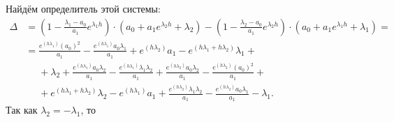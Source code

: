 \documentclass[a4paper,14pt]{article}
\begin{document}
Найдём определитель этой системы:
\[
  \begin{aligned}
    \Delta
    &=
      \left( 1 - \frac{\lambda_1 - a_0}{a_1} e^{\lambda_1 h} \right)
      \cdot
      \left(
      a_0 + a_1 e^{\lambda_2 h} + \lambda_2
      \right)
      -
      \left( 1 - \frac{\lambda_2 - a_0}{a_1} e^{\lambda_2 h} \right)
      \cdot
      \left(
      a_0 + a_1 e^{\lambda_1 h} + \lambda_1
      \right) = \\
    &=
    \frac{e^{(h \lambda_1)} (a_0)^2}{a_1}
    - \frac{e^{(h \lambda_1)} a_0 \lambda_1}{a_1}
    + e^{(h \lambda_2)} a_1 - e^{(h \lambda_1 + h \lambda_2)} \lambda_1 + \\
    &\phantom{=}
    + \lambda_2 + \frac{e^{(h \lambda_1)} a_0 \lambda_2}{a_1}
    - \frac{e^{(h \lambda_1)} \lambda_1 \lambda_2}{a_1}
    + \frac{e^{(h \lambda_2)} a_0 \lambda_2}{a_1}
    - \frac{e^{(h \lambda_2)} (a_0)^2}{a_1} + \\
    &\phantom{=}
    + e^{(h \lambda_1 + h \lambda_2)} \lambda_2 - e^{(h \lambda_1)} a_1
    + \frac{e^{(h \lambda_2)} \lambda_1 \lambda_2}{a_1}
    - \frac{e^{(h \lambda_2)} a_0 \lambda_1}{a_1} - \lambda_1.
  \end{aligned}
\]
Так как $\lambda_2 = - \lambda_1$, то
\end{document}
